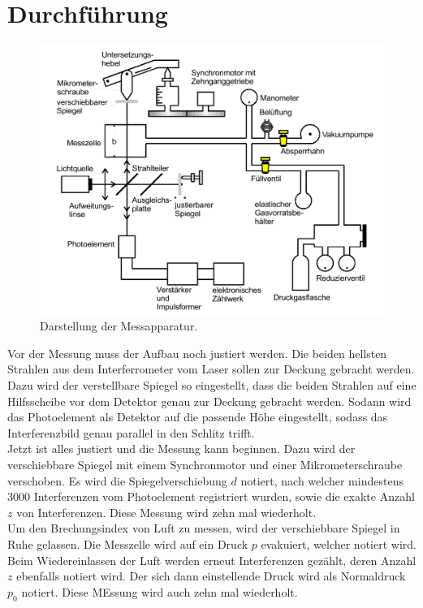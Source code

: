\section{Durchführung}
\label{sec:Durchführung}

\begin{figure}
    \centering
    \includegraphics[width=12cm]{data/abb4.png}
    \caption{Darstellung der Messapparatur. \cite{sample}}
    \label{fig:abb4}
\end{figure}
\FloatBarrier

Vor der Messung muss der Aufbau noch justiert werden.
Die beiden hellsten Strahlen aus dem Interferrometer vom Laser sollen zur Deckung gebracht werden.
Dazu wird der verstellbare Spiegel so eingestellt, dass die beiden Strahlen auf eine Hilfsscheibe vor dem Detektor genau zur Deckung gebracht werden.
Sodann wird das Photoelement als Detektor auf die passende Höhe eingestellt, sodass das Interferenzbild genau parallel in den Schlitz trifft.
\\
Jetzt ist alles justiert und die Messung kann beginnen.
Dazu wird der verschiebbare Spiegel mit einem Synchronmotor und einer Mikrometerschraube verschoben.
Es wird die Spiegelverschiebung $d$ notiert, nach welcher mindestens 3000 Interferenzen vom Photoelement registriert wurden, sowie die exakte Anzahl $z$ von Interferenzen.
Diese Messung wird zehn mal wiederholt.
\\
Um den Brechungsindex von Luft zu messen, wird der verschiebbare Spiegel in Ruhe gelassen.
Die Messzelle wird auf ein Druck $p$ evakuiert, welcher notiert wird.
Beim Wiedereinlassen der Luft werden erneut Interferenzen gezählt, deren Anzahl $z$ ebenfalls notiert wird.
Der sich dann einstellende Druck wird als Normaldruck $p_0$ notiert.
Diese MEssung wird auch zehn mal wiederholt.

